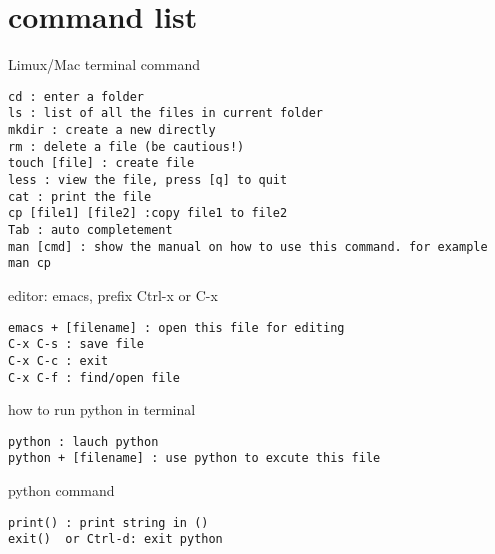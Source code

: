 \documentclass[aps,prb,12pt,tightenlines,%
notitlepage,longbibliography]{revtex4-1}
\begin{document}
\section{command list}
Limux/Mac terminal command
\begin{verbatim}
cd : enter a folder
ls : list of all the files in current folder
mkdir : create a new directly
rm : delete a file (be cautious!)
touch [file] : create file
less : view the file, press [q] to quit
cat : print the file
cp [file1] [file2] :copy file1 to file2
Tab : auto completement
man [cmd] : show the manual on how to use this command. for example
man cp
\end{verbatim}
editor: emacs, prefix Ctrl-x  or C-x

\begin{verbatim}
emacs + [filename] : open this file for editing
C-x C-s : save file
C-x C-c : exit
C-x C-f : find/open file
\end{verbatim}

how to run python in terminal
\begin{verbatim}
python : lauch python
python + [filename] : use python to excute this file
\end{verbatim}

python command
\begin{verbatim}
print() : print string in ()
exit()  or Ctrl-d: exit python
\end{verbatim}



\end{document}
